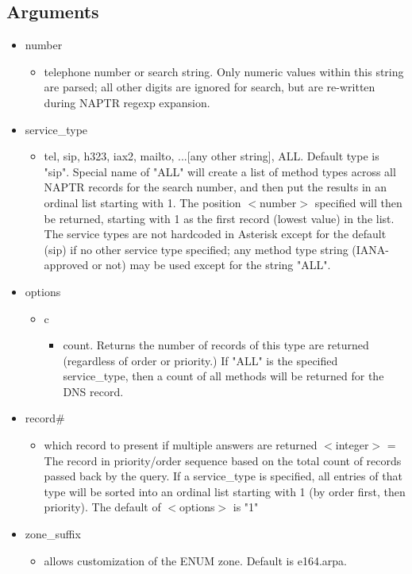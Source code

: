 \subsection{Arguments}

\begin{itemize}
  \item number
  \begin{itemize}
    \item telephone number or search string.  Only numeric values
    within this string are parsed; all other digits are ignored for
    search, but are re-written during NAPTR regexp expansion.
  \end{itemize}

  \item service\_type
  \begin{itemize}
     \item tel, sip, h323, iax2, mailto, ...[any other string],
     ALL. Default type is "sip".
     Special name of "ALL" will create a list of method types across
     all NAPTR records for the search number, and then put the results
     in an ordinal list starting with 1. The position $<$number$>$
     specified will then be returned, starting with 1 as the first
     record (lowest value) in the list.  The service types are not
     hardcoded in Asterisk except for the default (sip) if no other
     service type specified; any method type string (IANA-approved or
     not) may be used except for the string "ALL".
  \end{itemize}

  \item options
  \begin{itemize}
    \item c
    \begin{itemize}
      \item count. Returns the number of records of this type are returned
    (regardless of order or priority.)  If "ALL" is the specified
    service\_type, then a count of all methods will be returned for the
    DNS record.
    \end{itemize}
  \end{itemize}

  \item record\#
  \begin{itemize}
    \item which record to present if multiple answers are returned
    $<$integer$>$ = The record in priority/order sequence based on the
    total count of records passed back by the query. If a service\_type
    is specified, all entries of that type will be sorted into an
    ordinal list starting with 1 (by order first, then priority).
    The default of $<$options$>$ is "1"
  \end{itemize}

  \item zone\_suffix
  \begin{itemize}
    \item allows customization of the ENUM zone. Default is e164.arpa.
  \end{itemize}
\end{itemize}

